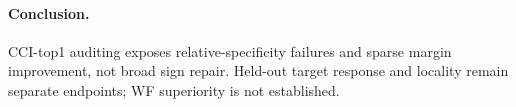 \documentclass[10pt]{article}
\begin{document}
\paragraph{Conclusion.}
CCI-top1 auditing exposes relative-specificity failures and sparse margin
improvement, not broad sign repair. Held-out target response and locality
remain separate endpoints; WF superiority is not established.

\clearpage
\balance


\end{document}
